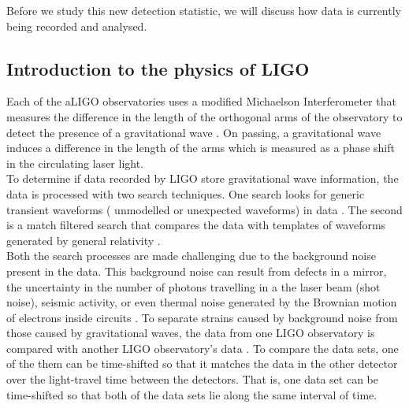 \documentclass{article}
\begin{document}
 Before we study this new detection statistic, we will discuss how data is currently being recorded and analysed.\\


\subsection{Introduction to the physics of LIGO} \label{section:intro}


 
 \indent Each of the aLIGO observatories uses a modified Michaelson Interferometer that measures the difference in the length of the orthogonal arms of the observatory to detect the presence of a gravitational wave \cite{DetectionPaper}. On passing, a gravitational wave induces a difference in the length of the arms which is measured as a phase shift in the circulating laser light.\\
 
  \indent To determine if data recorded by LIGO store gravitational wave information, the data is processed with two search techniques. One search looks for generic transient waveforms ( unmodelled or unexpected waveforms) in data \cite{Enia}. The second is a match filtered search that compares the data with templates of waveforms generated by general relativity \cite{Enia}.\\
  
  
  
  \indent Both the search processes are made challenging due to the background noise present in the data.  This background noise can result from defects in a mirror, the uncertainty in the number of photons travelling in a the laser beam (shot noise), seismic activity, or even thermal noise generated by the Brownian motion of electrons inside circuits \cite{RSmith}. To separate  strains caused by background noise from those caused by gravitational waves, the data from one LIGO observatory is compared with another LIGO observatory's data \cite{DetectionPaper}. To compare the data sets, one of the them can be time-shifted so that it matches the data in the other detector over the light-travel time between the detectors. That is, one data set can be time-shifted so that both of the data sets lie along the same interval of time.\\
  
\end{document}
